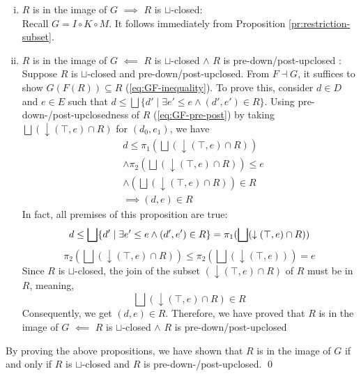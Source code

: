 \documentclass{llncs}
\newcommand{\join}{\sqcup}
\newcommand{\bigjoin}{\bigsqcup}
\newcommand{\comp}{\circ}
\begin{document}
\begin{enumerate}[i.]
\item{$R$ is in the image of $G$ $\implies$ $R$ is $\join$-closed:}\\
  Recall $G = I \comp K \comp M$. It follows immediately from Proposition \ref{pr:restriction-subset}.
\item{$R$ is in the image of $G$ $\impliedby$ $R$ is $\join$-closed $\land$ $R$ is pre-down/post-upclosed :}\\
  Suppose $R$ is $\join$-closed and pre-down/post-upclosed.
  From $F \dashv G$, it suffices to show $G(F(R)) \subseteq R$ (\ref{eq:GF-inequality}).
  To prove this, consider $d \in D$ and $e \in E$ such that $d \leq \bigjoin \{d' \mid \exists e' \leq e \land (d' , e') \in R \}$.
  Using pre-down-/post-upclosedness of $R$ (\ref{eq:GF-pre-post}) by taking $\bigjoin (\downarrow (\top , e) \cap R)$ for $(d_0 , e_1)$, we have
  \begin{align*}
    &d \leq \pi_{1} (\bigjoin (\downarrow (\top , e) \cap R)) \\
    &\land \pi_{2} (\bigjoin (\downarrow (\top , e) \cap R)) \leq e\\
    &\land (\bigjoin (\downarrow (\top , e) \cap R)) \in R\\
    &\implies (d, e) \in R
  \end{align*}
  In fact, all premises of this proposition are true:
  \begin{equation}
     d \leq \bigjoin \{d' \mid \exists e' \leq e \land (d' , e') \in R \} = \pi_{1} (\bigjoin (\downarrow (\top , e) \cap R)) \\
  \end{equation}
  \begin{equation}
     \pi_{2} (\bigjoin (\downarrow (\top , e) \cap R)) \leq \pi_{2} (\bigjoin (\downarrow (\top , e))) = e
  \end{equation}
   Since $R$ is $\join$-closed, the join of the subset $(\downarrow (\top , e) \cap R)$ of $R$ must be in $R$, meaning,
  \begin{equation*} \bigjoin (\downarrow (\top , e) \cap R) \in R
  \end{equation*}
  Consequently, we get $(d, e) \in R$.
  Therefore, we have proved that $R$ is in the image of $G$ $\impliedby$ $R$ is $\join$-closed $\land$ $R$ is pre-down/post-upclosed
\end{enumerate}
By proving the above propositions, we have shown that $R$ is in the image of $G$ if and only if $R$ is $\join$-closed and $R$ is pre-down-/post-upclosed. \qed
\end{document}
